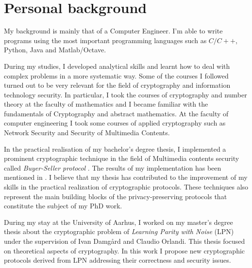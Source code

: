 \documentclass[dvips,12pt]{article}
\begin{document}
\section{Personal background}
My background is mainly that of a Computer Engineer.
I'm able to write programs using the most important programming languages such as $C / C++$, Python, Java and Matlab/Octave.

During my studies, I developed analytical skills and learnt how to deal with complex problems in a more systematic way. Some of the courses I followed turned out to be very relevant for the field of cryptography and information technology security. 
In particular, I took the courses of cryptography and number theory at the faculty of mathematics and I became familiar with the fundamentals of Cryptography and abstract mathematics.
At the faculty of computer engineering I took some courses of applied cryptography such as Network Security and Security of Multimedia Contents.

In the practical realisation of my bachelor's degree thesis, I implemented a prominent cryptographic technique in the field of Multimedia contents security called \emph{Buyer-Seller protocol} \cite{tesi}. 
The results of my implementation has been mentioned in \cite{tesi2}.
I believe that my thesis has contributed to the improvement of my skills in the practical realization of  cryptographic protocols. These techniques also represent the main building blocks of the privacy-preserving protocols that constitute the subject of my PhD work.

During my stay at the University of Aarhus, I worked on my master's degree thesis about the cryptographic problem of \emph{Learning Parity with Noise} (LPN) \cite{lpn} under the supervision of Ivan Damg{\aa}rd and Claudio Orlandi. 
This thesis focused on theoretical aspects of cryptography. In this work I propose new cryptographic protocols derived from LPN addressing their correctness and security issues.
\end{document}
